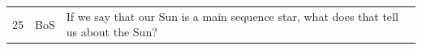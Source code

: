 \documentclass[10pt]{article}
\begin{document}
\begin{tiny}
\begin{longtable}{|r|p{0.375in}|p{1.275in}|p{3.5in}|}
25 &          BoS &                                                                                                                                                                                            If we say that our Sun is a main sequence star, what does that tell us about the Sun? &                                                                                                                                                                                                                                                                                                                                                                                                                                                                                                                                                                                                                                                                                                                                                                                                                                                                                                                                                                                                                                                                                                                                                                                                                                                                                                                                                                                                                                                                                                                                                                                                                                                                                                                                                                                                                                                                                                                                                                                                                                                                                                                                                                                                                                                                                                                                                                                                                                                                                                                                                                                                                                                                                                                                                                                                                                                                                                                                                                                                                                                                                               
\end{longtable}
\end{tiny}
\end{document}
